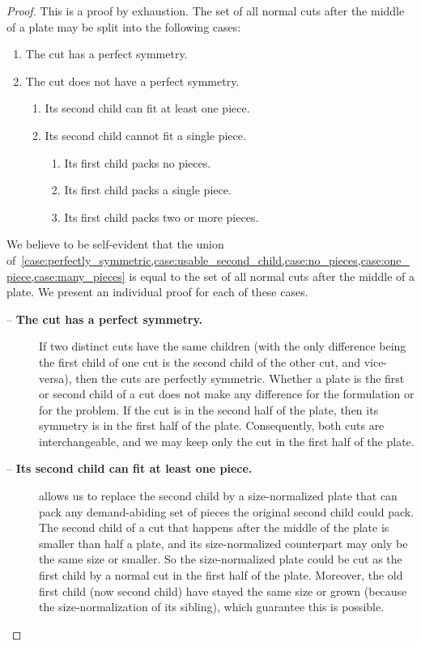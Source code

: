 \documentclass[ppgc,prop-tese,english,formais,babel]{iiufrgs}
\begin{document}
\begin{proof} This is a proof by exhaustion. The set of all normal cuts after the middle of a plate may be split into the following cases:
\begin{enumerate}
  \item The cut has a perfect symmetry. \label{case:perfectly_symmetric}
  \item The cut does not have a perfect symmetry.
  \begin{enumerate}
    \item Its second child can fit at least one piece. \label{case:usable_second_child}
    \item Its second child cannot fit a single piece.
    \begin{enumerate}
      \item Its first child packs no pieces. \label{case:no_pieces}
      \item Its first child packs a single piece. \label{case:one_piece} %
      \item Its first child packs two or more pieces. \label{case:many_pieces}
    \end{enumerate}
  \end{enumerate}
\end{enumerate}

We believe to be self-evident that the union of~\cref{case:perfectly_symmetric,case:usable_second_child,case:no_pieces,case:one_piece,case:many_pieces} is equal to the set of all normal cuts after the middle of a plate. We present an individual proof for each of these cases.

\begin{description}
\item[ -- \textbf{The cut has a perfect symmetry.}]
If two distinct cuts have the same children (with the only difference being the first child of one cut is the second child of the other cut, and vice-versa), then the cuts are perfectly symmetric.
Whether a plate is the first or second child of a cut does not make any difference for the formulation or for the problem.
If the cut is in the second half of the plate, then its symmetry is in the first half of the plate.
Consequently, both cuts are interchangeable, and we may keep only the cut in the first half of the plate.
\item[ -- \textbf{Its second child can fit at least one piece.}]
 allows us to replace the second child by a size-normalized plate that can pack any demand-abiding set of pieces the original second child could pack.
The second child of a cut that happens after the middle of the plate is smaller than half a plate, and its size-normalized counterpart may only be the same size or smaller.
So the size-normalized plate could be cut as the first child by a normal cut in the first half of the plate.
Moreover, the old first child (now second child) have stayed the same size or grown (because the size-normalization of its sibling), which guarantee this is possible.


\end{description}
\end{proof}
\end{document}
